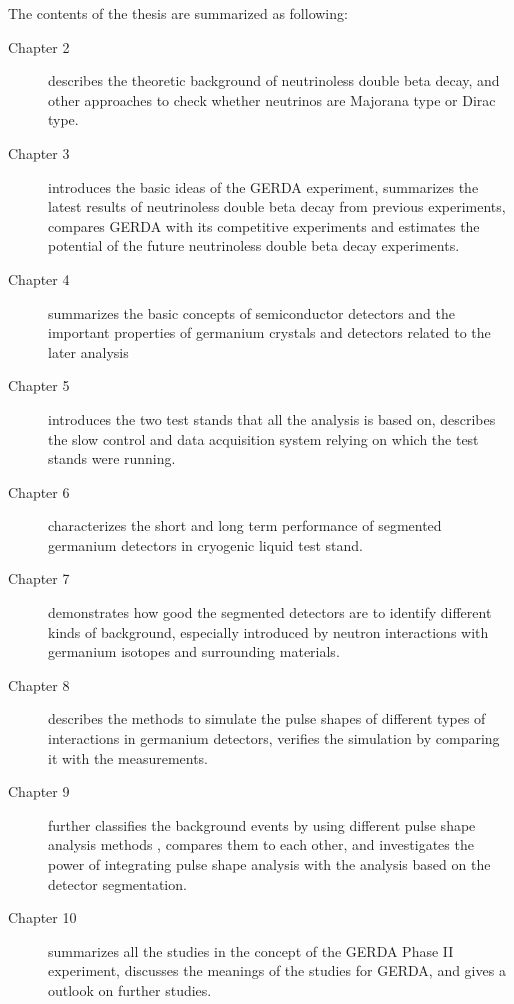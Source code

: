 The contents of the thesis are summarized as following:
\begin{description}
\item[Chapter 2] describes the theoretic background of neutrinoless
  double beta decay, and other approaches to check whether neutrinos
  are Majorana type or Dirac type.
\item[Chapter 3] introduces the basic ideas of the GERDA experiment,
  summarizes the latest results of neutrinoless double beta decay from
  previous experiments, compares GERDA with its competitive
  experiments and estimates the potential of the future neutrinoless
  double beta decay experiments.
\item[Chapter 4] summarizes the basic concepts of semiconductor
  detectors and the important properties of germanium crystals and
  detectors related to the later analysis
\item[Chapter 5] introduces the two test stands that all the analysis
  is based on, describes the slow control and data acquisition system
  relying on which the test stands were running.
\item[Chapter 6] characterizes the short and long term performance of
  segmented germanium detectors in cryogenic liquid test stand.
\item[Chapter 7] demonstrates how good the segmented detectors are to
  identify different kinds of background, especially introduced by
  neutron interactions with germanium isotopes and surrounding
  materials.
\item[Chapter 8] describes the methods to simulate the pulse shapes of
  different types of interactions in germanium detectors, verifies the
  simulation by comparing it with the measurements.
\item[Chapter 9] further classifies the background events by using
  different pulse shape analysis methods , compares them to each
  other, and investigates the power of integrating pulse shape
  analysis with the analysis based on the detector segmentation.
\item[Chapter 10] summarizes all the studies in the concept of the
  GERDA Phase II experiment, discusses the meanings of the studies for
  GERDA, and gives a outlook on further studies.
\end{description}


